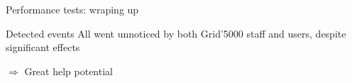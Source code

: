 \documentclass[10pt]{beamer}
\newcommand{\addframe}[1] {\texttt{[image: demo\_old.pdf]}}
\begin{document}
\begin{frame}{Performance tests: wraping up}
\begin{minipage}{0.4\linewidth}
\begin{block}{Detected events}
            All went unnoticed by both Grid'5000 staff and users, despite significant effects

            \alert{\(\Rightarrow\) Great help potential}
        \end{block}
    \end{minipage}

\end{frame}


\end{document}
